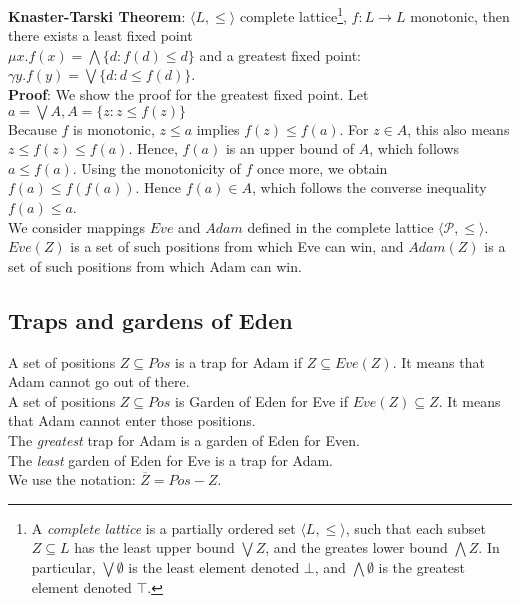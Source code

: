 \noindent
\textbf{Knaster-Tarski Theorem}: $\langle L, \le \rangle$ complete lattice\footnote{
	A \textit{complete lattice} is a partially ordered set $\langle L, \leq \rangle$, such that
	each subset $Z \subseteq L$ has the least upper bound $\bigvee Z$, and the greates lower
	bound $\bigwedge Z$. In particular, $\bigvee \emptyset$ is the least element denoted $\bot$,
	and $\bigwedge \emptyset$ is the greatest element denoted $\top$.
}, $f : L \rightarrow L$ monotonic,
then there exists a least fixed point\\
$\mu x. f(x) = \bigwedge \{d : f(d) \leq d\}$ and a greatest fixed point:\\
$\gamma y. f(y) = \bigvee \{d : d \leq f(d) \}$.\\
\textbf{Proof}: We show the proof for the greatest fixed point. Let $a = \bigvee A, A = \{z : z \leq f(z)\}$\\
Because $f$ is monotonic, $z \leq a$ implies $f(z) \leq f(a)$. For $z \in A$, this also means $z \leq f(z) \leq f(a)$.
Hence, $f(a)$ is an upper bound of $A$, which follows $a \leq f(a)$. Using the monotonicity of $f$ once more, we obtain
$f(a) \leq f(f(a))$. Hence $f(a) \in A$, which follows the converse inequality $f(a) \leq a$.\\

\noindent
We consider mappings $Eve$ and $Adam$ defined in the complete lattice $\langle \mathcal{P}, \leq \rangle$.
$Eve(Z)$ is a set of such positions from which Eve can win, and $Adam(Z)$ is a set of such positions from which Adam can win.

\subsection*{Traps and gardens of Eden}
\noindent
A set of positions $Z \subseteq Pos$ is a trap for Adam if $Z \subseteq Eve(Z)$. It means that Adam cannot go out of there.\\
A set of positions $Z \subseteq Pos$ is Garden of Eden for Eve if $Eve(Z) \subseteq Z$. It means that Adam cannot enter those positions.\\

\noindent
The \textit{greatest} trap for Adam is a garden of Eden for Even.\\
The \textit{least} garden of Eden for Eve is a trap for Adam.\\

We use the notation: $\overline{Z} = Pos - Z$.

